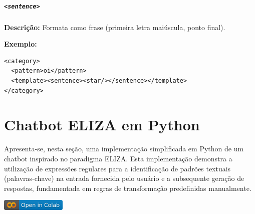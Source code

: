 \documentclass[a4paper,oneside]{book}
\begin{document}
\paragraph{\texttt{<sentence>}} 

\textbf{Descrição:} Formata como frase (primeira letra maiúscula, ponto final). 

\textbf{Exemplo:}

\begin{verbatim}
<category>
  <pattern>oi</pattern>
  <template><sentence><star/></sentence></template>
</category>
\end{verbatim}


\chapter{Chatbot ELIZA em Python}

Apresenta-se, nesta seção, uma implementação simplificada em Python de um chatbot inspirado no paradigma ELIZA. Esta implementação demonstra a utilização de expressões regulares para a identificação de padrões textuais (palavras-chave) na entrada fornecida pelo usuário e a subsequente geração de respostas, fundamentada em regras de transformação predefinidas manualmente.

\vspace{\baselineskip}
\href{https://colab.research.google.com/github/giseldo/chatbotbook/blob/main/notebook/eliza.ipynb}{
  \includegraphics{fig/colab-badge.png}
}
\end{document}
